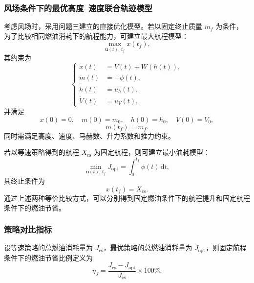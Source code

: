 \documentclass[withoutpreface,bwprint]{cumcmthesis} %
\begin{document}
\subsubsection{风场条件下的最优高度--速度联合轨迹模型}

考虑风场时，采用问题三建立的直接优化模型。若以固定终止质量 $m_f$ 为条件，
为了比较相同燃油消耗下的航程能力，可建立最大航程模型：
\begin{equation}
    \max_{\boldsymbol u(t),\,t_f}
    x(t_f),
    \label{eq:q4_range_objective}
\end{equation}
其约束为
\begin{equation}
\left\{
\begin{aligned}
    \dot x(t)&=V(t)+W(h(t)),\\
    \dot m(t)&=-\phi(t),\\
    \dot h(t)&=u_h(t),\\
    \dot V(t)&=u_V(t),
\end{aligned}
\right.
\label{eq:q4_opt_state}
\end{equation}
并满足
\begin{equation}
    x(0)=0,\quad m(0)=m_0,\quad h(0)=h_0,\quad V(0)=V_0,
    \label{eq:q4_opt_initial}
\end{equation}
\begin{equation}
    m(t_f)=m_f.
    \label{eq:q4_opt_terminal_mass}
\end{equation}
同时需满足高度、速度、马赫数、升力系数和推力约束。

若以等速策略得到的航程 $X_{\mathrm{cs}}$ 为固定航程，则可建立最小油耗模型：
\begin{equation}
    \min_{\boldsymbol u(t),\,t_f}
    J_{\mathrm{opt}}
    =
    \int_0^{t_f}\phi(t)\,\mathrm{d}t,
    \label{eq:q4_fuel_objective}
\end{equation}
其终止条件为
\begin{equation}
    x(t_f)=X_{\mathrm{cs}}.
    \label{eq:q4_fixed_range}
\end{equation}
通过上述两种等价比较方式，可以分别得到固定燃油条件下的航程提升和固定航程条件下的燃油节省。

\subsubsection{策略对比指标}

设等速策略的总燃油消耗量为 $J_{\mathrm{cs}}$，最优策略的总燃油消耗量为
$J_{\mathrm{opt}}$，则固定航程条件下的燃油节省比例定义为
\begin{equation}
    \eta_J
    =
    \frac{J_{\mathrm{cs}}-J_{\mathrm{opt}}}{J_{\mathrm{cs}}}\times 100\%.
    \label{eq:q4_fuel_saving}
\end{equation}
\end{document}
